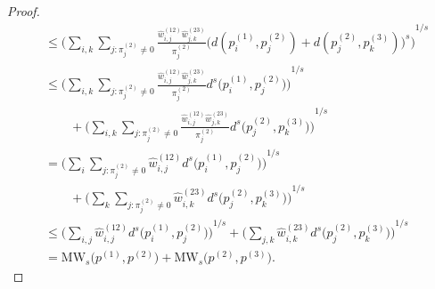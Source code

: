 \documentclass{article}
\begin{document}
\begin{proof}
\begin{equation*}
\begin{split}
        &\leq {\bigg(\sum_{i,k} \sum_{j \colon \pi^{(2)}_j \neq 0} \frac{\hat{w}^{(12)}_{i,j} \hat{w}^{(23)}_{j,k}}{\pi^{(2)}_j} \big(d(p^{(1)}_i, p^{(2)}_j) + d(p^{(2)}_j, p^{(3)}_k)\big)^s\bigg)}^{1/s} \\
        &\leq {\bigg(\sum_{i,k} \sum_{j \colon \pi^{(2)}_j \neq 0} \frac{\hat{w}^{(12)}_{i,j} \hat{w}^{(23)}_{j,k}}{\pi^{(2)}_j} d^s\Big(p^{(1)}_i, p^{(2)}_j\Big)\bigg)}^{1/s} \\
        &\qquad + {\bigg(\sum_{i,k} \sum_{j \colon \pi^{(2)}_j \neq 0} \frac{\hat{w}^{(12)}_{i,j} \hat{w}^{(23)}_{j,k}}{\pi^{(2)}_j} d^s\Big(p^{(2)}_j, p^{(3)}_k\Big)\bigg)}^{1/s} \\
        &= {\bigg(\sum_{i} \sum_{j \colon \pi^{(2)}_j \neq 0} \hat{w}^{(12)}_{i,j} d^s\Big(p^{(1)}_i, p^{(2)}_j\Big)\bigg)}^{1/s} \\
        &\qquad + {\bigg(\sum_{k} \sum_{j \colon \pi^{(2)}_j \neq 0} \hat{w}^{(23)}_{i,k} d^s\Big(p^{(2)}_j, p^{(3)}_k\Big)\bigg)}^{1/s} \\
        &\leq {\bigg(\sum_{i,j} \hat{w}^{(12)}_{i,j} d^s\Big(p^{(1)}_i, p^{(2)}_j\Big)\bigg)}^{1/s} + {\bigg(\sum_{j,k} \hat{w}^{(23)}_{i,k} d^s\Big(p^{(2)}_j, p^{(3)}_k\Big)\bigg)}^{1/s} \\
        &= \mathrm{MW}_s\big(p^{(1)}, p^{(2)}\big) + \mathrm{MW}_s\big(p^{(2)}, p^{(3)}\big).
        \end{split}
    \end{equation*}
    

\end{proof}
\end{document}
